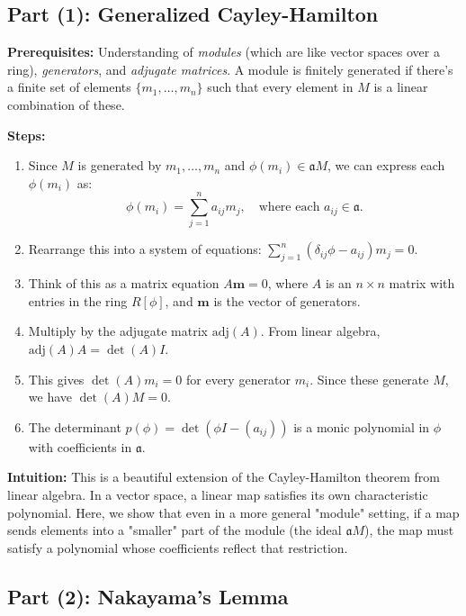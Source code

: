 \begin{solution}
\subsection*{Part (1): Generalized Cayley-Hamilton}

\textbf{Prerequisites:} 
Understanding of \textit{modules} (which are like vector spaces over a ring), \textit{generators}, and \textit{adjugate matrices}. A module is finitely generated if there's a finite set of elements $\{m_1, \dots, m_n\}$ such that every element in $M$ is a linear combination of these.

\textbf{Steps:}
\begin{enumerate}
    \item Since $M$ is generated by $m_1, \dots, m_n$ and $\phi(m_i) \in \mathfrak{a}M$, we can express each $\phi(m_i)$ as:
    \[ \phi(m_i) = \sum_{j=1}^n a_{ij} m_j, \quad \text{where each } a_{ij} \in \mathfrak{a}. \]
    \item Rearrange this into a system of equations: $\sum_{j=1}^n (\delta_{ij} \phi - a_{ij}) m_j = 0$.
    \item Think of this as a matrix equation $A \mathbf{m} = 0$, where $A$ is an $n \times n$ matrix with entries in the ring $R[\phi]$, and $\mathbf{m}$ is the vector of generators.
    \item Multiply by the adjugate matrix $\mathrm{adj}(A)$. From linear algebra, $\mathrm{adj}(A) A = \det(A) I$.
    \item This gives $\det(A) m_i = 0$ for every generator $m_i$. Since these generate $M$, we have $\det(A) M = 0$.
    \item The determinant $p(\phi) = \det(\phi I - (a_{ij}))$ is a monic polynomial in $\phi$ with coefficients in $\mathfrak{a}$.
\end{enumerate}

\textbf{Intuition:}
This is a beautiful extension of the Cayley-Hamilton theorem from linear algebra. In a vector space, a linear map satisfies its own characteristic polynomial. Here, we show that even in a more general "module" setting, if a map sends elements into a "smaller" part of the module (the ideal $\mathfrak{a}M$), the map must satisfy a polynomial whose coefficients reflect that restriction.

\par\vspace{1.5em}

\subsection*{Part (2): Nakayama's Lemma}


\end{solution}
